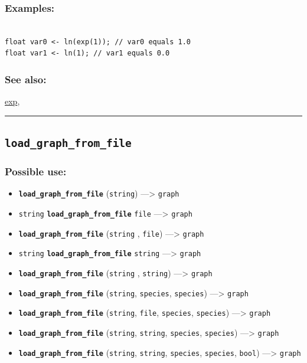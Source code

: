 \documentclass[]{book}
\providecommand{\tightlist}{%
  \setlength{\itemsep}{0pt}\setlength{\parskip}{0pt}}
\theoremstyle{definition}
\theoremstyle{definition}
\theoremstyle{definition}
\theoremstyle{remark}
\begin{document}
\subsubsection{Examples:}\label{examples-225}

\begin{verbatim}
 
float var0 <- ln(exp(1)); // var0 equals 1.0 
float var1 <- ln(1); // var1 equals 0.0
\end{verbatim}

\subsubsection{See also:}\label{see-also-128}

\href{operators-d-to-h.html\#exp}{exp},

\begin{center}\rule{0.5\linewidth}{\linethickness}\end{center}

\subsection{\texorpdfstring{\texttt{load\_graph\_from\_file}}{load\_graph\_from\_file}}\label{load_graph_from_file}

\subsubsection{Possible use:}\label{possible-use-326}

\begin{itemize}
\tightlist
\item
  \textbf{\texttt{load\_graph\_from\_file}} (\texttt{string})
  ---\textgreater{} \texttt{graph}
\item
  \texttt{string} \textbf{\texttt{load\_graph\_from\_file}}
  \texttt{file} ---\textgreater{} \texttt{graph}
\item
  \textbf{\texttt{load\_graph\_from\_file}} (\texttt{string} ,
  \texttt{file}) ---\textgreater{} \texttt{graph}
\item
  \texttt{string} \textbf{\texttt{load\_graph\_from\_file}}
  \texttt{string} ---\textgreater{} \texttt{graph}
\item
  \textbf{\texttt{load\_graph\_from\_file}} (\texttt{string} ,
  \texttt{string}) ---\textgreater{} \texttt{graph}
\item
  \textbf{\texttt{load\_graph\_from\_file}} (\texttt{string},
  \texttt{species}, \texttt{species}) ---\textgreater{} \texttt{graph}
\item
  \textbf{\texttt{load\_graph\_from\_file}} (\texttt{string},
  \texttt{file}, \texttt{species}, \texttt{species}) ---\textgreater{}
  \texttt{graph}
\item
  \textbf{\texttt{load\_graph\_from\_file}} (\texttt{string},
  \texttt{string}, \texttt{species}, \texttt{species}) ---\textgreater{}
  \texttt{graph}
\item
  \textbf{\texttt{load\_graph\_from\_file}} (\texttt{string},
  \texttt{string}, \texttt{species}, \texttt{species}, \texttt{bool})
  ---\textgreater{} \texttt{graph}
\end{itemize}
\end{document}
